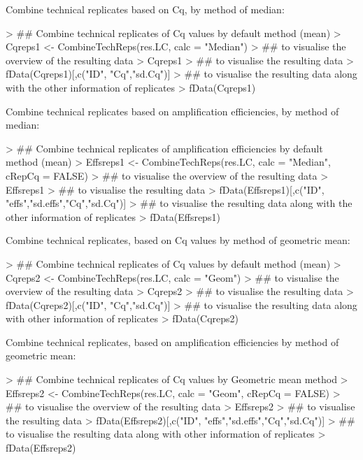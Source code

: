 \documentclass[11pt]{article}
\begin{document}
Combine technical replicates based on Cq, by method of median:
\begin{Schunk}
\begin{Sinput}
> ## Combine technical replicates of Cq values by default method (mean)
> Cqreps1 <- CombineTechReps(res.LC, calc = "Median")
> ## to visualise the overview of the resulting data
> Cqreps1 
> ## to visualise the resulting data
> fData(Cqreps1)[,c("ID", "Cq","sd.Cq")]
> ## to visualise the resulting data along with the other information of replicates
> fData(Cqreps1) 
\end{Sinput}
\end{Schunk}

Combine technical replicates based on amplification efficiencies, by method of median: 
\begin{Schunk}
\begin{Sinput}
> ## Combine technical replicates of amplification efficiencies by default method (mean)
> Effsreps1 <- CombineTechReps(res.LC, calc = "Median", cRepCq = FALSE)
> ## to visualise the overview of the resulting data
> Effsreps1 
> ## to visualise the resulting data
> fData(Effsreps1)[,c("ID", "effs","sd.effs","Cq","sd.Cq")] 
> ## to visualise the resulting data along with the other information of replicates
> fData(Effsreps1) 
\end{Sinput}
\end{Schunk}

Combine technical replicates, based on Cq values by method of geometric mean:
\begin{Schunk}
\begin{Sinput}
> ## Combine technical replicates of Cq values by default method (mean)
> Cqreps2 <- CombineTechReps(res.LC, calc = "Geom")
> ## to visualise the overview of the resulting data
> Cqreps2 
> ## to visualise the resulting data
> fData(Cqreps2)[,c("ID", "Cq","sd.Cq")]                                            
> ## to visualise the resulting data along with other information of replicates
> fData(Cqreps2) 
\end{Sinput}
\end{Schunk}

Combine technical replicates, based on amplification efficiencies by method of geometric mean:
\begin{Schunk}
\begin{Sinput}
> ## Combine technical replicates of Cq values by Geometric mean method
> Effsreps2 <- CombineTechReps(res.LC, calc = "Geom", cRepCq = FALSE)
> ## to visualise the overview of the resulting data
> Effsreps2 
> ## to visualise the resulting data
> fData(Effsreps2)[,c("ID", "effs","sd.effs","Cq","sd.Cq")]
> ## to visualise the resulting data along with other information of replicates
> fData(Effsreps2)   
\end{Sinput}
\end{Schunk}
\end{document}
